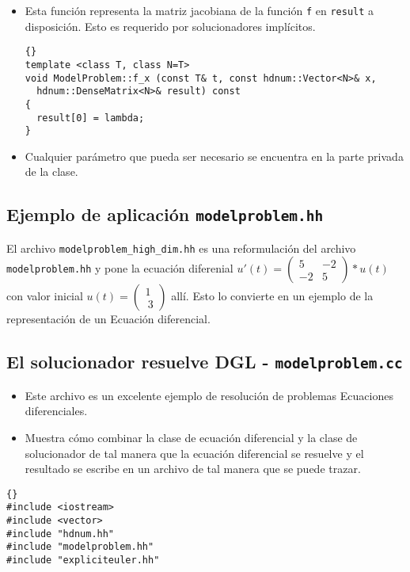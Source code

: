 \begin{itemize}
\item Esta función representa la matriz jacobiana de la función
  \lstinline{f} en \lstinline{result} a disposición. Esto es requerido por solucionadores implícitos.

{\footnotesize{\begin{lstlisting}{}
template <class T, class N=T>
void ModelProblem::f_x (const T& t, const hdnum::Vector<N>& x,
  hdnum::DenseMatrix<N>& result) const
{
  result[0] = lambda;
}
\end{lstlisting}}}

\item Cualquier parámetro que pueda ser necesario se encuentra en la parte privada de la clase.

\end{itemize}


\subsection{Ejemplo de aplicación \lstinline{modelproblem.hh}}
El archivo \lstinline{modelproblem_high_dim.hh} es una reformulación
del archivo \lstinline{modelproblem.hh} y pone la
ecuación diferenial $u'(t) = \begin{pmatrix}
  5 & -2\\
  -2 & 5
\end{pmatrix}*u(t)$ con valor inicial
$ u(t) = \left( \begin{array}{c}1 \\\ 3 \end{array}\right)$ allí. Esto lo convierte en un ejemplo de la representación de un Ecuación diferencial.

\subsection{El solucionador resuelve DGL - \lstinline{modelproblem.cc}}
\begin{itemize}
\item Este archivo es un excelente ejemplo de resolución de problemas
   Ecuaciones diferenciales.
\item Muestra cómo combinar la clase de ecuación diferencial y la clase de solucionador de tal manera que la ecuación diferencial se resuelve y el resultado se escribe en un archivo de tal manera que se puede trazar.
\end{itemize}

{\footnotesize{\begin{lstlisting}{}
#include <iostream>
#include <vector>
#include "hdnum.hh"
#include "modelproblem.hh"
#include "expliciteuler.hh"
\end{lstlisting}}}

